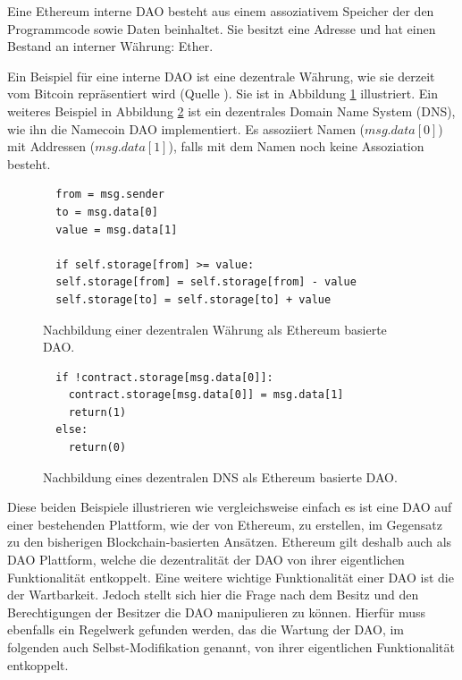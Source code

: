 \documentclass[a4paper,12pt]{report}
\begin{document}
Eine Ethereum interne DAO besteht aus einem assoziativem Speicher der den Programmcode sowie Daten beinhaltet. Sie besitzt eine Adresse und hat einen Bestand an interner Währung: Ether.

Ein Beispiel für eine interne DAO ist eine dezentrale Währung, wie sie derzeit vom Bitcoin repräsentiert wird (Quelle \cite{Butterin2014}). Sie ist in Abbildung \ref{contract1} illustriert. Ein weiteres Beispiel in Abbildung \ref{contract2} ist ein dezentrales Domain Name System (DNS), wie ihn die Namecoin DAO implementiert. Es assoziiert Namen ($msg.data[0]$) mit Addressen ($msg.data[1]$), falls mit dem Namen noch keine Assoziation besteht.



\begin{figure}[ht]
  \centering
\begin{lstlisting}
  from = msg.sender
  to = msg.data[0]
  value = msg.data[1]

  if self.storage[from] >= value:
  self.storage[from] = self.storage[from] - value
  self.storage[to] = self.storage[to] + value
\end{lstlisting}
  \caption{Nachbildung einer dezentralen Währung als Ethereum basierte DAO.}
  \label{contract1}
\end{figure}

\begin{figure}[ht]
  \centering
\begin{lstlisting}
  if !contract.storage[msg.data[0]]:
    contract.storage[msg.data[0]] = msg.data[1]
    return(1)
  else:
    return(0)
\end{lstlisting}
  \caption{Nachbildung eines dezentralen DNS als Ethereum basierte DAO.}
  \label{contract2}
\end{figure}

Diese beiden Beispiele illustrieren wie vergleichsweise einfach es ist eine DAO auf einer bestehenden Plattform, wie der von Ethereum, zu erstellen, im Gegensatz zu den bisherigen Blockchain-basierten Ansätzen. Ethereum gilt deshalb auch als DAO Plattform, welche die dezentralität der DAO von ihrer eigentlichen Funktionalität entkoppelt. Eine weitere wichtige Funktionalität einer DAO ist die der Wartbarkeit. Jedoch stellt sich hier die Frage nach dem Besitz und den Berechtigungen der Besitzer die DAO manipulieren zu können. Hierfür muss ebenfalls ein Regelwerk gefunden werden, das die Wartung der DAO, im folgenden auch Selbst-Modifikation genannt, von ihrer eigentlichen Funktionalität entkoppelt. 
\end{document}
